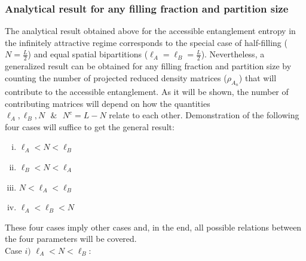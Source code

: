 \subsubsection{Analytical result for any filling fraction and partition size}

The analytical result obtained above for the accessible entanglement entropy in the infinitely attractive regime corresponds to the special case of half-filling ($N = \frac{L}{2}$) and equal spatial bipartitions ($\ell_{A} = \ell_{B} = \frac{L}{2}$). Nevertheless, a generalized result can be obtained for any filling fraction and partition size by counting the number of projected reduced density matrices ($\rho_{A_n}$) that will contribute to the accessible entanglement. As it will be shown, the number of contributing matrices will depend on how the quantities $\ell_{A}, \ell_{B}, N \text{ } \&  \text{ }N^{c} = L-N$ relate to each other. Demonstration of the following four cases will suffice to get the general result:
%
\begin{enumerate}[i)]
  \item $\ell_{A} < N < \ell_{B}$
  \item $\ell_{B} < N < \ell_{A}$
  \item $N < \ell_{A} < \ell_{B}$
  \item $\ell_{A} < \ell_{B} < N$
\end{enumerate}
%
These four cases imply other cases and, in the end, all possible relations between the four parameters will be covered. \\

Case $i)$ $\ell_{A} < N < \ell_{B}$:

